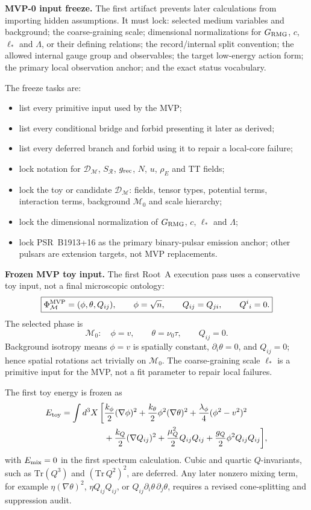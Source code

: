 \documentclass[11pt]{article}
\begin{document}
\medskip\noindent\textbf{MVP-0 input freeze.}
The first artifact prevents later calculations from importing hidden
assumptions.  It must lock: selected medium variables and background; the
coarse-graining scale; dimensional normalizations for
\(G_{\rm RMG}\), \(c\), \(\ell_*\) and \(\Lambda\), or their defining
relations; the record/internal split convention; the allowed internal gauge
group and observables; the target low-energy action form; the primary local
observation anchor; and the exact status vocabulary.

The freeze tasks are:
\begin{itemize}
\item list every primitive input used by the MVP;
\item list every conditional bridge and forbid presenting it later as derived;
\item list every deferred branch and forbid using it to repair a local-core
  failure;
\item lock notation for \(\mathcal D_{\mathcal M}\), \(S_{\mathcal R}\),
  \(g_{\rm rec}\), \(N\), \(u\), \(\rho_E\) and TT fields;
\item lock the toy or candidate \(\mathcal D_{\mathcal M}\): fields, tensor
  types, potential terms, interaction terms, background \(\mathcal M_0\) and
  scale hierarchy;
\item lock the dimensional normalization of \(G_{\rm RMG}\), \(c\), \(\ell_*\)
  and \(\Lambda\);
\item lock PSR~B1913+16 as the primary binary-pulsar emission anchor; other
  pulsars are extension targets, not MVP replacements.
\end{itemize}

\medskip\noindent\textbf{Frozen MVP toy input.}
The first Root~A execution pass uses a conservative toy input, not a final
microscopic ontology:
\[
\boxed{
\Phi_{\mathcal M}^{\rm MVP}=(\phi,\theta,Q_{ij}),\qquad
\phi=\sqrt n,\qquad Q_{ij}=Q_{ji},\qquad Q^i{}_i=0 .
}
\]
The selected phase is
\[
\boxed{
\mathcal M_0:\quad
\phi=v,\qquad \theta=\nu_0\tau,\qquad Q_{ij}=0 .
}
\]
Background isotropy means \(\phi=v\) is spatially constant,
\(\partial_i\theta=0\), and \(Q_{ij}=0\); hence spatial rotations act
trivially on \(\mathcal M_0\).  The coarse-graining scale \(\ell_*\) is a
primitive input for the MVP, not a fit parameter to repair local failures.

The first toy energy is frozen as
\[
\begin{aligned}
E_{\rm toy}=\int d^3X\,\bigg[
&\frac{k_\phi}{2}(\nabla\phi)^2
+\frac{k_\theta}{2}\phi^2(\nabla\theta)^2
+\frac{\lambda_\phi}{4}(\phi^2-v^2)^2\\
&+\frac{k_Q}{2}(\nabla Q_{ij})^2
+\frac{\mu_Q^2}{2}Q_{ij}Q_{ij}
+\frac{g_Q}{2}\phi^2 Q_{ij}Q_{ij}
\bigg],
\end{aligned}
\]
with \(E_{\rm mix}=0\) in the first spectrum calculation.  Cubic and quartic
\(Q\)-invariants, such as \(\mathrm{Tr}(Q^3)\) and
\((\mathrm{Tr}\,Q^2)^2\), are deferred.  Any later nonzero mixing term, for
example \(\eta(\nabla\theta)^2\), \(\eta Q_{ij}Q_{ij}\), or
\(Q_{ij}\partial_i\theta\,\partial_j\theta\), requires a revised
cone-splitting and suppression audit.
\end{document}
